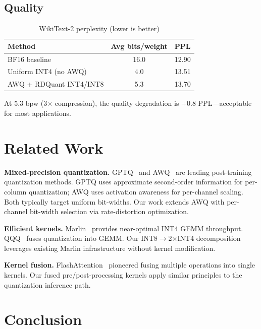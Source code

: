 \documentclass[11pt,a4paper]{article}
\begin{document}
\subsection{Quality}

\begin{table}[h]
\centering
\caption{WikiText-2 perplexity (lower is better)}
\label{tab:ppl}
\begin{tabular}{lcc}
\toprule
Method & Avg bits/weight & PPL \\
\midrule
BF16 baseline & 16.0 & 12.90 \\
Uniform INT4 (no AWQ) & 4.0 & 13.51 \\
AWQ + RDQuant INT4/INT8 & 5.3 & 13.70 \\
\bottomrule
\end{tabular}
\end{table}

At 5.3 bpw (3$\times$ compression), the quality degradation is +0.8 PPL---acceptable for most applications.


\section{Related Work}
\label{sec:related}

\textbf{Mixed-precision quantization.}
GPTQ~\cite{frantar2023gptq} and AWQ~\cite{lin2024awq} are leading post-training quantization methods. GPTQ uses approximate second-order information for per-column quantization; AWQ uses activation awareness for per-channel scaling. Both typically target uniform bit-widths. Our work extends AWQ with per-channel bit-width selection via rate-distortion optimization.

\textbf{Efficient kernels.}
Marlin~\cite{frantar2024marlin} provides near-optimal INT4 GEMM throughput. QQQ~\cite{lin2024qqq} fuses quantization into GEMM. Our INT8$\to$2$\times$INT4 decomposition leverages existing Marlin infrastructure without kernel modification.

\textbf{Kernel fusion.}
FlashAttention~\cite{dao2022flashattention} pioneered fusing multiple operations into single kernels. Our fused pre/post-processing kernels apply similar principles to the quantization inference path.


\section{Conclusion}
\label{sec:conclusion}
\end{document}
